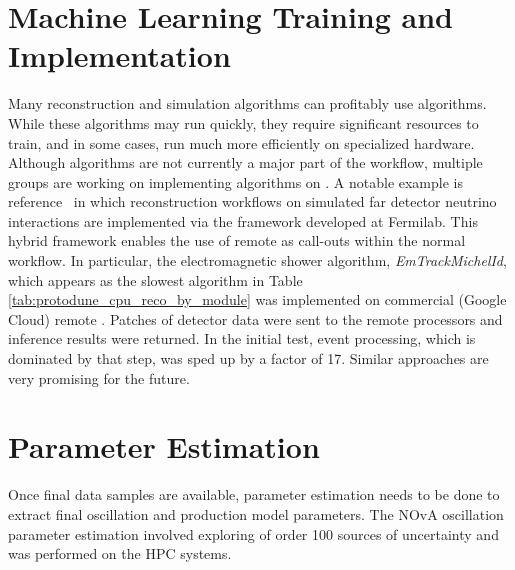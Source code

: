 \documentclass[../main-v1.tex]{subfiles}
\begin{document}
\section{Machine Learning Training and Implementation} 
Many reconstruction and simulation algorithms can profitably use  algorithms.  While these algorithms may run quickly, they   require significant resources to train, and in some cases, run much more efficiently on specialized hardware.  Although  algorithms are not currently a major part of the  workflow, multiple groups are working on implementing  algorithms on .  A notable example is reference~\cite{Wang:2020fjr} in which  reconstruction workflows on simulated far detector neutrino interactions are implemented via the  framework developed at Fermilab. This hybrid framework enables the use of remote  as call-outs within the normal workflow.  In particular, the electromagnetic shower algorithm, {\it EmTrackMichelId}, which appears as the slowest algorithm in Table \ref{tab:protodune_cpu_reco_by_module} was implemented on commercial (Google Cloud) remote . Patches of detector data were sent to the remote processors and inference results were returned.  In the initial test, event processing, which is dominated by that step, was sped up by a factor of 17. Similar approaches are very promising for the future.  


\section{Parameter Estimation}
Once final data samples are available, parameter estimation needs to be done to extract final oscillation and production  model parameters.  The NOvA oscillation parameter estimation \cite{NOvA:2021nfi} involved exploring of order 100 sources of uncertainty and was performed on the  HPC systems.  

\end{document}
